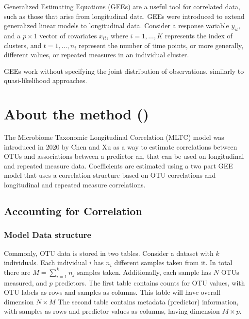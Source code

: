 \documentclass[12pt]{article}
\begin{document}
Generalized Estimating Equations (GEEs) are a useful tool for correlated data, such as those that arise from longitudinal data. GEEs were introduced to extend generalized linear models to longitudinal data. \cite{liang1986longitudinal} Consider a response variable $y_{it}$, and a $p \times 1$ vector of covariates $x_{it}$, where $i = 1, \ldots , K$ represents the index of clusters, and $t = 1, \ldots , n_i$ represent the number of time points, or more generally, different values, or repeated measures in an individual cluster.

GEEs work without specifying the joint distribution of observations, similarly to quasi-likelihood approaches.







\section{About the method ()}

The Microbiome Taxonomic Longitudinal Correlation (MLTC) model was introduced in 2020 by Chen and Xu\cite{chen2020generalized} as a way to estimate correlations between OTUs and associations between a predictor an, that can be used on longitudinal and repeated measure data. Coefficients are estimated using a two part GEE model that uses a correlation structure based on OTU correlations and longitudinal and repeated measure correlations.

\subsection{Accounting for Correlation}


\subsubsection{Model Data structure}
Commonly, OTU data is stored in two tables. Consider a dataset with $k$ individuals. Each individual $i$ has $n_i$ different samples taken from it. In total there are $M = \sum_{i=1}^k n_j$ samples taken.
Additionally, each sample has $N$ OTUs measured, and $p$ predictors. The first table contains counts for OTU values, with OTU labels as rows and samples as columns. This table will have overall dimension $N \times M$ The second table contains metadata (predictor) information, with samples as rows and predictor values as columns, having dimension $M \times p$.
\end{document}
